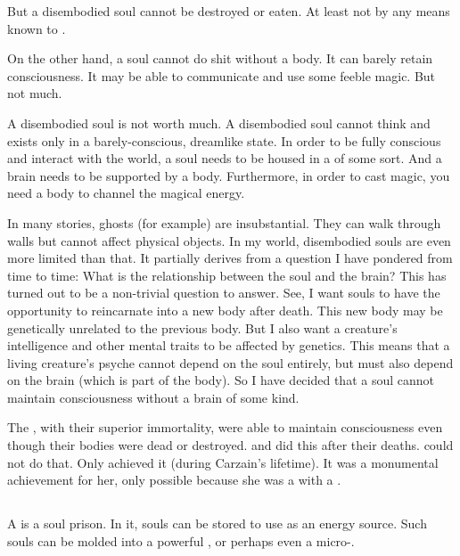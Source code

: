 But a disembodied soul cannot be destroyed or eaten. 
At least not by any means known to \Miithians. 

On the other hand, a soul cannot do shit without a body. 
It can barely retain consciousness. 
It may be able to communicate and use some feeble magic. 
But not much. 

A disembodied soul is not worth much.
A disembodied soul cannot think and exists only in a barely-conscious, dreamlike state.
In order to be fully conscious and interact with the world, a soul needs to be housed in a  of some sort. And a brain needs to be supported by a body.
Furthermore, in order to cast magic, you need a body to channel the magical energy.

In many stories, ghosts (for example) are insubstantial. They can walk through walls but cannot affect physical objects.
In my world, disembodied souls are even more limited than that.
It partially derives from a question I have pondered from time to time: What is the relationship between the soul and the brain?
This has turned out to be a non-trivial question to answer. 
See, I want souls to have the opportunity to reincarnate into a new body after death. This new body may be genetically unrelated to the previous body.
But I also want a creature's intelligence and other mental traits to be affected by genetics.
This means that a living creature's psyche cannot depend on the soul entirely, but must also depend on the brain (which is part of the body). 
So I have decided that a soul cannot maintain consciousness without a brain of some kind.

The \dragons, with their superior immortality, were able to maintain consciousness even though their bodies were dead or destroyed. 
\Sethicus and \Tiamat did this after their deaths.
\Resphain could not do that. 
Only \Shiaraid achieved it (during Carzain's lifetime). 
It was a monumental achievement for her, only possible because she was a \sathariah \malach with a \carcer.









\subsection{\Carcers}
\index{\carcer}
A \carcer{} is a soul prison. 
In it, souls can be stored to use as an energy source. 
Such souls can be molded into a powerful \vertex, or perhaps even a micro-\dweomer. 









